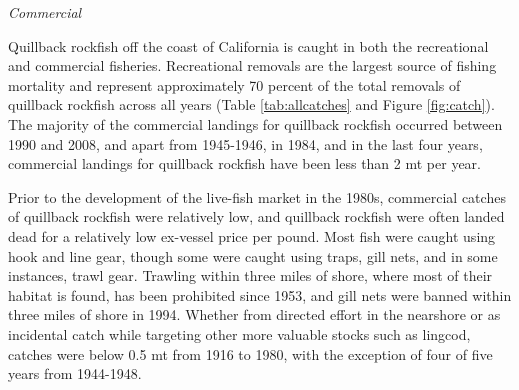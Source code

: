 \documentclass[11pt,
  english,
  a4paper,
]{article}
\begin{document}
\leavevmode\tagmcend\tagstructend


\emph{Commercial}

\leavevmode\tagmcend\tagstructend\par


Quillback rockfish off the coast of California is caught in both the recreational and commercial fisheries. Recreational removals are the largest source of fishing mortality and represent approximately 70 percent of the total removals of quillback rockfish across all years (Table \ref{tab:allcatches} and Figure \ref{fig:catch}). The majority of the commercial landings for quillback rockfish occurred between 1990 and 2008, and apart from 1945-1946, in 1984, and in the last four years, commercial landings for quillback rockfish have been less than 2 mt per year.

\leavevmode\tagmcend\tagstructend\par


Prior to the development of the live-fish market in the 1980s, commercial catches of quillback rockfish were relatively low, and quillback rockfish were often landed dead for a relatively low ex-vessel price per pound. Most fish were caught using hook and line gear, though some were caught using traps, gill nets, and in some instances, trawl gear. Trawling within three miles of shore, where most of their habitat is found, has been prohibited since 1953, and gill nets were banned within three miles of shore in 1994. Whether from directed effort in the nearshore or as incidental catch while targeting other more valuable stocks such as lingcod, catches were below 0.5 mt from 1916 to 1980, with the exception of four of five years from 1944-1948.

\leavevmode\tagmcend\tagstructend\par

\end{document}
